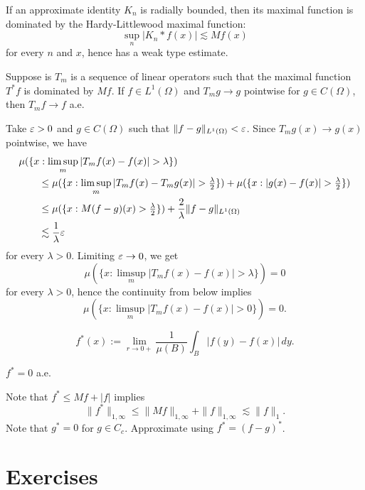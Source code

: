 \documentclass{../../large}
\begin{document}
\begin{prb}
If an approximate identity $K_n$ is radially bounded, then its maximal function is dominated by the Hardy-Littlewood maximal function:
\[\sup_n|K_n*f(x)|\lesssim Mf(x)\]
for every $n$ and $x$, hence has a weak type estimate.
\end{prb}


\begin{prb}
Suppose is $T_m$ is a sequence of linear operators such that the maximal function $T^*f$ is dominated by $Mf$.
If $f\in L^1(\Omega)$ and $T_mg\to g$ pointwise for $g\in C(\Omega)$, then $T_mf\to f$ a.e.
\end{prb}
\begin{pf}
Take $\varepsilon>0$ and $g\in C(\Omega)$ such that $\|f-g\|_{L^1(\Omega)}<\varepsilon$.
Since $T_mg(x)\to g(x)$ pointwise, we have
\begin{align*}
&\mu(\{x:\limsup_m|T_mf(x)-f(x)|>\lambda\})\\
&\qquad\le\mu(\{x:\limsup_m|T_mf(x)-T_mg(x)|>\tfrac\lambda2\})
+\mu(\{x:|g(x)-f(x)|>\tfrac\lambda2\})\\
&\qquad\le\mu(\{x:M(f-g)(x)>\tfrac\lambda2\})+\frac2\lambda\|f-g\|_{L^1(\Omega)}\\
&\qquad\lesssim\frac1\lambda\e
\end{align*}
for every $\lambda>0$.
Limiting $\varepsilon\to0$, we get
\[\mu(\{x:\limsup_m|T_mf(x)-f(x)|>\lambda\})=0\]
for every $\lambda>0$, hence the continuity from below implies
\[\mu(\{x:\limsup_m|T_mf(x)-f(x)|>0\})=0.\]
\end{pf}


\begin{defn}
\[f^*(x):=\lim_{r\to0+}\frac1{\mu(B)}\int_B|f(y)-f(x)|\,dy.\]
\end{defn}
\begin{thm}
$f^*=0$ a.e.
\end{thm}
\begin{pf}
Note that $f^*\le Mf+|f|$ implies
\[\|f^*\|_{1,\infty}\le\|Mf\|_{1,\infty}+\|f\|_{1,\infty}\lesssim\|f\|_1.\]
Note that $g^*=0$ for $g\in C_c$.
Approximate using $f^*=(f-g)^*$.
\end{pf}

\section*{Exercises}
\begin{prb}

\end{prb}
\end{document}

